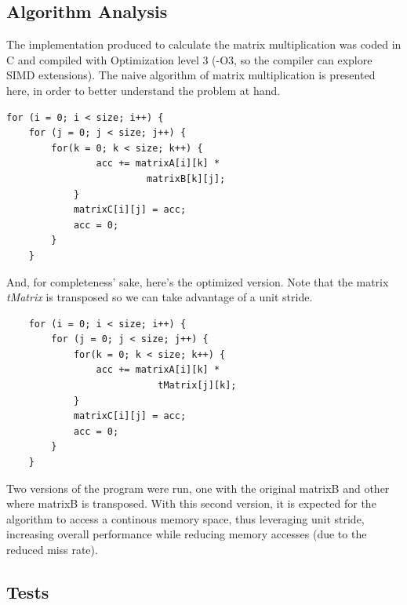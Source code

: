 \documentclass[a4paper,10pt,openright,openbib,twocolumn]{article}
\begin{document}
\subsection{Algorithm Analysis}
The implementation produced to calculate the matrix multiplication was coded in C and compiled with Optimization level 3 (-O3, so the compiler can explore SIMD extensions).
The naive algorithm of matrix multiplication is presented here, in order to better understand the problem at hand.
\small
\begin{verbatim}
for (i = 0; i < size; i++) {
    for (j = 0; j < size; j++) {
        for(k = 0; k < size; k++) {
                acc += matrixA[i][k] * 
                         matrixB[k][j];				
            }		
            matrixC[i][j] = acc;	
            acc = 0;
        }
    }
\end{verbatim}

And, for completeness' sake, here's the optimized version. Note that the matrix \emph{tMatrix} is transposed so we can take advantage of a unit stride. 
\small
\begin{verbatim}
    for (i = 0; i < size; i++) {
        for (j = 0; j < size; j++) {
            for(k = 0; k < size; k++) {
                acc += matrixA[i][k] * 
                           tMatrix[j][k];				
            }		
            matrixC[i][j] = acc;	
            acc = 0;
        }
    }		
\end{verbatim}

Two versions of the program were run, one with the original matrixB and other where matrixB is transposed. With this second version, it is expected for the algorithm to access a continous memory space, thus leveraging unit stride, increasing overall performance while reducing memory accesses (due to the reduced miss rate).

\subsection{Tests}
\end{document}
